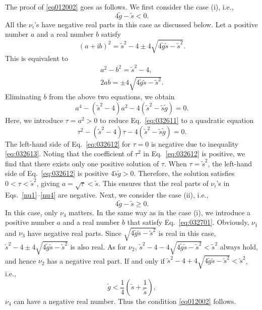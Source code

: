 \documentclass[aps,pra,superscriptaddress,twocolumn
]{revtex4-2}
\renewcommand{\i}{\mathrm{i}}
\begin{document}
 
 The proof of \eqref{eq012002} goes as follows. 
 We first consider the case (i), i.e.,
 \begin{equation}
   4\tilde g - \tilde s < 0. \label{eq:032613} 
 \end{equation}
 All the $\nu_i$'s have negative real parts in this case as discussed below. 
 Let a positive number $a$ and a real number $b$ satisfy 
 \begin{equation}
  (a+\i b)^2 = {\tilde s^2 - 4 \pm 4\sqrt{4\tilde g \tilde s - \tilde s^2}}. \label{eq:032701}
 \end{equation}
 This is equivalent to 
 \begin{gather}
  a^2 - b^2 = \tilde s^2 - 4, \\
   2ab = \pm 4\sqrt{4\tilde g \tilde s - \tilde s^2}.
 \end{gather}
 Eliminating $b$ from the above two equations, we obtain 
 \begin{equation}
  a^4 - (\tilde s^2 - 4)a^2 - 4(\tilde s^2 - \tilde s \tilde g) = 0. \label{eq:032611}
 \end{equation}
 Here, we introduce $\tau = a^2 > 0$ to reduce Eq.~\eqref{eq:032611} to 
 a quadratic equation 
 \begin{equation}
   \tau^2 -(\tilde s^2 - 4)\tau - 4(\tilde s^2 - \tilde s \tilde g) = 0.\label{eq:032612}
 \end{equation}
 The left-hand side of Eq.~\eqref{eq:032612} for $\tau=0$ is negative 
 due to inequality \eqref{eq:032613}.
 Noting that the coefficient of $\tau^2$ in Eq.~\eqref{eq:032612} is positive, 
 we find that there exists only one positive solution of $\tau$.
 When $\tau=\tilde s^2$, the left-hand side of Eq.~\eqref{eq:032612} 
 is positive $4\tilde s \tilde g > 0$.
 Therefore, the solution satisfies $0<\tau < \tilde s^2$, 
 giving $a = \sqrt{\tau} < \tilde s$. 
 This ensures that 
 the real parts of $\nu_i$'s in Eqs.~\eqref{nu1}--\eqref{nu4} are negative.
 Next, we consider the case (ii), i.e., 
 \begin{equation}
   4\tilde g - \tilde s \geqslant 0. \label{eq:032614}
 \end{equation}
 In this case, only $\nu_4$ matters.
 In the same way as in the case (i), 
 we introduce a positive number $a$ and a real number $b$ that satisfy Eq.~\eqref{eq:032701}.
 Obviously, $\nu_1$ and $\nu_3$ have negative real parts.
 Since $\sqrt{4\tilde g \tilde s - \tilde s^2}$ is real in this case,
 $\tilde s^2 - 4 \pm 4\sqrt{4\tilde g \tilde s - \tilde s^2}$ is also real.
 As for $\nu_2$, $\tilde s^2 - 4 - 4\sqrt{4\tilde g \tilde s - \tilde s^2} < \tilde s^2$ always hold, 
 and hence $\nu_2$ has a negative real part.
 If and only if $\tilde s^2 - 4 + 4\sqrt{4\tilde g \tilde s - \tilde s^2} < \tilde s^2$, 
 i.e.,
 \begin{equation}
  \tilde g < \frac{1}{4}\left(\tilde s + \frac{1}{\tilde s} \right),
 \end{equation}
 $\nu_4$ can have a negative real number.
 Thus the condition \eqref{eq012002} follows.
 
\end{document}
